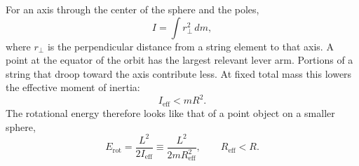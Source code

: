 For an axis through the center of the sphere and the poles,
\begin{equation}
  I=\int r_\perp^2\,dm,
  \label{eq:l09-extended-inertia}
\end{equation}
where \(r_\perp\) is the perpendicular distance from a string element to
that axis.  A point at the equator of the orbit has the largest relevant
lever arm.  Portions of a string that droop toward the axis contribute less.
At fixed total mass this lowers the effective moment of inertia:
\begin{equation}
  I_{\mathrm{eff}}<mR^2.
  \label{eq:l09-inertia-reduction}
\end{equation}
The rotational energy therefore looks like that of a point object on a
smaller sphere,
\begin{equation}
  E_{\mathrm{rot}}
  =\frac{L^2}{2I_{\mathrm{eff}}}
  \equiv \frac{L^2}{2mR_{\mathrm{eff}}^2},
  \qquad R_{\mathrm{eff}}<R.
  \label{eq:l09-effective-radius}
\end{equation}

\begin{classroomqa}
\end{classroomqa}

